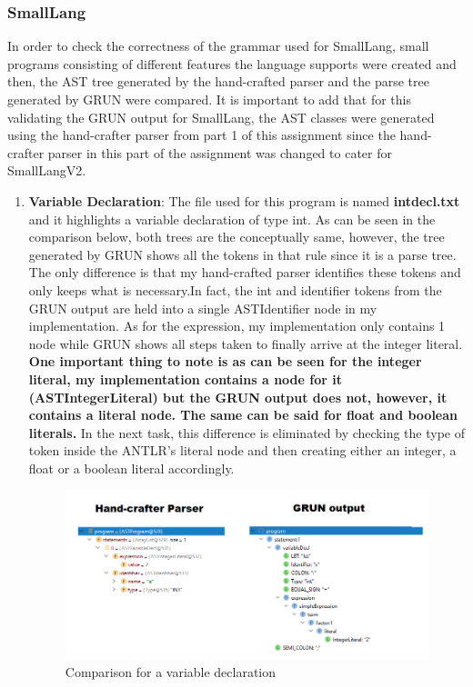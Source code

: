 \documentclass{article}
\begin{document}
		\subsubsection{SmallLang}
		
		In order to check the correctness of the grammar used for SmallLang, small programs consisting of different features the language supports were created and then, the AST tree generated by the hand-crafted parser and the parse tree generated by GRUN were compared. It is important to add that for this validating the GRUN output for SmallLang, the AST classes were generated using the hand-crafter parser from part 1 of this assignment since the hand-crafter parser in this part of the assignment was changed to cater for SmallLangV2.
		
		\begin{enumerate}
		\item \textbf{Variable Declaration}: The file used for this program is named \textbf{intdecl.txt} and it highlights a variable declaration of type int. As can be seen in the comparison below, both trees are the conceptually same, however, the tree generated by GRUN shows all the tokens in that rule since it is a parse tree. The only difference is that my hand-crafted parser identifies these tokens and only keeps what is necessary.In fact, the int and identifier tokens from the GRUN output are held into a single ASTIdentifier node in my implementation. As for the expression, my implementation only contains 1 node while GRUN shows all steps taken to finally arrive at the integer literal. \textbf{One important thing to note is as can be seen for the integer literal, my implementation contains a node for it (ASTIntegerLiteral) but the GRUN output does not, however, it contains a literal node. The same can be said for float and boolean literals.} In the next task, this difference is eliminated by checking the type of token inside the ANTLR's literal node and then creating either an integer, a float or a boolean literal accordingly.
						\begin{figure}[H]
					\centering
			 			\includegraphics[width=\textwidth]{comparedecl.png}
			  			\caption{Comparison for a variable declaration}
			  			\label{fig:comparedecl}
					\end{figure}
					

\end{enumerate}
\end{document}
